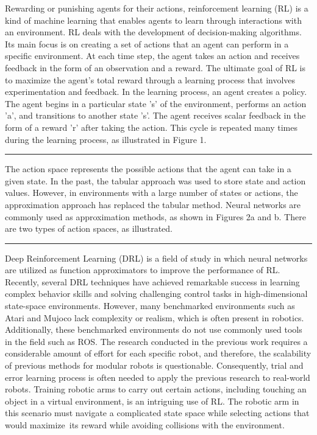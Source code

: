 \documentclass[12pt,oneside]{article}
\begin{document}
Rewarding or punishing agents for their actions, reinforcement learning (RL) is a kind of machine learning that enables agents to learn through interactions with an environment. RL deals with the development of decision-making algorithms. Its main focus is on creating a set of actions that an agent can perform in a specific environment. At each time step, the agent takes an action and receives feedback in the form of an observation and a reward. The ultimate goal of RL is to maximize the agent's total reward through a learning process that involves experimentation and feedback. 
In the learning process, an agent creates a policy. The agent begins in a particular state 's' of the environment, performs an action 'a', and transitions to another state 's'. The agent receives scalar feedback in the form of a reward 'r' after taking the action. This cycle is repeated many times during the learning process, as illustrated in Figure 1.
\par\noindent\rule{\textwidth}{0.4pt}
 The action space represents the possible actions that the agent can take in a given state. In the past, the tabular approach was used to store state and action values. However, in environments with a large number of states or actions, the approximation approach has replaced the tabular method. Neural networks are commonly used as approximation methods, as shown in Figures 2a and b. There are two types of action spaces, as illustrated.
 \par\noindent\rule{\textwidth}{0.4pt}
Deep Reinforcement Learning (DRL) is a field of study in which neural networks are utilized as function approximators to improve the performance of RL. Recently, several DRL techniques have achieved remarkable success in learning complex behavior skills and solving challenging control tasks in high-dimensional state-space \cite{28_wu2017scalable} environments. However, many benchmarked environments such as Atari \cite{29_mnih2013playing} and Mujoco \cite{30_todorov2012mujoco} lack complexity or realism, which is often present in robotics. Additionally, these benchmarked environments \cite{31_nogueira2017autonomously} do not use commonly used tools in the field such as ROS.
The research conducted in the previous work requires a considerable amount of effort for each specific robot, and therefore, the scalability of previous methods for modular robots is questionable. Consequently, trial and error learning process is often needed to apply the previous research to real-world robots. Training robotic arms to carry out certain actions, including touching an object in a virtual environment, is an intriguing use of RL. The robotic arm in this scenario must navigate a complicated state space while selecting actions that would maximize its reward while avoiding collisions with the environment. 
\end{document}
